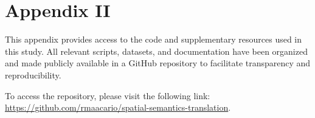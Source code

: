 \section*{Appendix II}
\label{app:2}

This appendix provides access to the code and supplementary resources used in this study. All relevant scripts, datasets, and documentation have been organized and made publicly available in a GitHub repository to facilitate transparency and reproducibility.

To access the repository, please visit the following link: \url{https://github.com/rmaacario/spatial-semantics-translation}.
